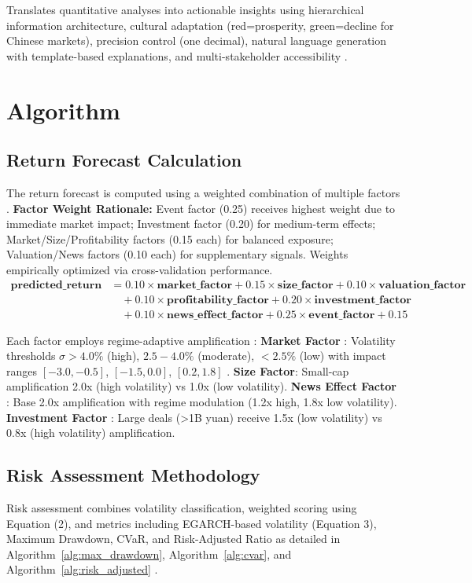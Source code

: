 \documentclass[3p,times,procedia]{elsarticle}
\begin{document}
Translates quantitative analyses into actionable insights using hierarchical information architecture, cultural adaptation (red=prosperity, green=decline for Chinese markets), precision control (one decimal), natural language generation with template-based explanations, and multi-stakeholder accessibility \cite{Ribeiro2016,Harvey2016}.

\section{Algorithm}

\subsection{Return Forecast Calculation}
The return forecast is computed using a weighted combination of multiple factors \cite{FAMA1993}. \textbf{Factor Weight Rationale:} Event factor (0.25) receives highest weight due to immediate market impact; Investment factor (0.20) for medium-term effects; Market/Size/Profitability factors (0.15 each) for balanced exposure; Valuation/News factors (0.10 each) for supplementary signals. Weights empirically optimized via cross-validation performance.
\begin{align}
\mathbf{predicted\_return} &= 0.10 \times \mathbf{market\_factor} + 0.15 \times \mathbf{size\_factor} + 0.10 \times \mathbf{valuation\_factor} \nonumber \\
&\quad + 0.10 \times \mathbf{profitability\_factor} + 0.20 \times \mathbf{investment\_factor} \nonumber \\
&\quad + 0.10 \times \mathbf{news\_effect\_factor} + 0.25 \times \mathbf{event\_factor} + 0.15
\end{align}

Each factor employs regime-adaptive amplification \cite{Carhart1997}: \textbf{Market Factor} \cite{FAMA1993}: Volatility thresholds $\sigma > 4.0\%$ (high), $2.5-4.0\%$ (moderate), $<2.5\%$ (low) with impact ranges $[-3.0, -0.5]$, $[-1.5, 0.0]$, $[0.2, 1.8]$ \cite{Nelson1991}. \textbf{Size Factor}: Small-cap amplification 2.0x (high volatility) vs 1.0x (low volatility). \textbf{News Effect Factor} \cite{TETLOCK2007}: Base 2.0x amplification with regime modulation (1.2x high, 1.8x low volatility). \textbf{Investment Factor} \cite{Daniel1998}: Large deals (>1B yuan) receive 1.5x (low volatility) vs 0.8x (high volatility) amplification.

\subsection{Risk Assessment Methodology}
Risk assessment combines volatility classification, weighted scoring using Equation (2), and metrics including EGARCH-based volatility (Equation 3), Maximum Drawdown, CVaR, and Risk-Adjusted Ratio as detailed in Algorithm~\ref{alg:max_drawdown}, Algorithm~\ref{alg:cvar}, and Algorithm~\ref{alg:risk_adjusted} \cite{Jorion2001}.
\end{document}
